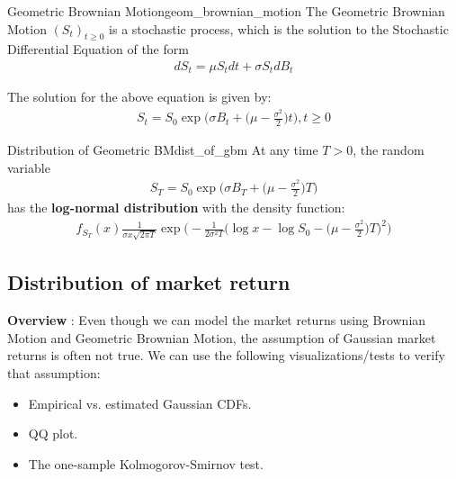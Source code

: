 \begin{proposition}{Geometric Brownian Motion}{geom_brownian_motion}
    The Geometric Brownian Motion $(S_t)_{t\ge 0}$ is a stochastic process, which is the solution to the Stochastic Differential Equation of the form
    \begin{align*}
        dS_t = \mu S_t dt + \sigma S_t dB_t
    \end{align*}

    \noindent The solution for the above equation is given by:
    \begin{align*}
        \boxed{
        S_t = S_0 \exp\Bigg( \sigma B_t + \Bigg( \mu - \frac{\sigma^2}{2} \Bigg)t \Bigg), t \ge 0
        }
    \end{align*}
\end{proposition}

\begin{proposition}{Distribution of Geometric BM}{dist_of_gbm}
    At any time $T > 0$, the random variable 
    \begin{align*}
        S_T = S_0 \exp\Bigg( \sigma B_T + \Bigg( \mu - \frac{\sigma^2}{2} \Bigg)T \Bigg)
    \end{align*}
    \noindent has the \textbf{log-normal distribution} with the density function:
    \begin{align*}
        \boxed{
            f_{S_T}(x) \frac{1}{\sigma x \sqrt{2\pi T}}\exp\Bigg( 
                -\frac{1}{2\sigma^2 T} \Bigg(\log x - \log S_0 - \Bigg( \mu - \frac{\sigma^2}{2} \Bigg)T \Bigg)^2
            \Bigg)
        }
    \end{align*}
\end{proposition}

\subsection{Distribution of market return}
\textbf{Overview} : Even though we can model the market returns using Brownian Motion and Geometric Brownian Motion, the assumption of Gaussian market returns is often not true. We can use the following visualizations/tests to verify that assumption:
\begin{itemize}
    \item Empirical vs. estimated Gaussian CDFs.
    \item QQ plot.
    \item The one-sample Kolmogorov-Smirnov test.
\end{itemize}

